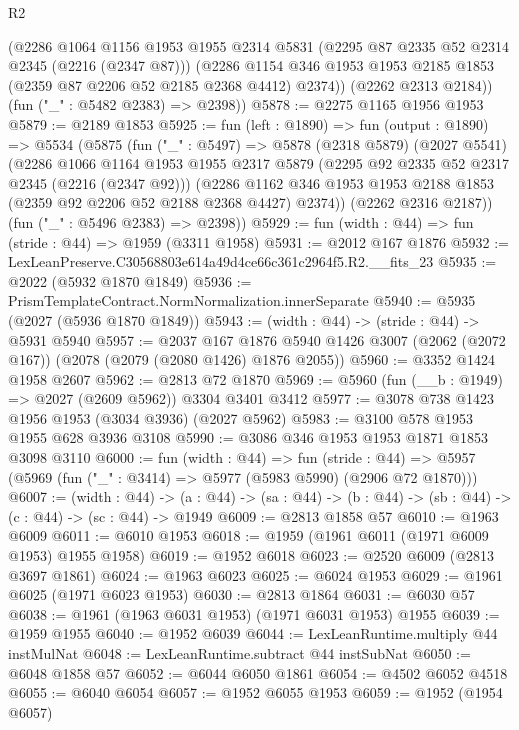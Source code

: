 \begin{lexlean}{R2}
\begin{coremodule}
        (@2286
          @1064
          @1156
          @1953
          @1955
          @2314
          @5831
          (@2295 @87 @2335 @52 @2314 @2345 (@2216 (@2347 @87)))
          (@2286 @1154 @346 @1953 @1953 @2185 @1853 (@2359 @87 @2206 @52 @2185 @2368 @4412) @2374))
        (@2262 @2313 @2184))
      (fun ("_" : @5482 @2383) => @2398))
@5878 := @2275 @1165 @1956 @1953
@5879 := @2189 @1853
@5925 := fun (left : @1890) =>
  fun (output : @1890) =>
  @5534
    (@5875
      (fun ("_" : @5497) =>
      @5878
        (@2318 @5879)
        (@2027 @5541)
        (@2286
          @1066
          @1164
          @1953
          @1955
          @2317
          @5879
          (@2295 @92 @2335 @52 @2317 @2345 (@2216 (@2347 @92)))
          (@2286 @1162 @346 @1953 @1953 @2188 @1853 (@2359 @92 @2206 @52 @2188 @2368 @4427) @2374))
        (@2262 @2316 @2187))
      (fun ("_" : @5496 @2383) => @2398))
@5929 := fun (width : @44) => fun (stride : @44) => @1959 (@3311 @1958)
@5931 := @2012 @167 @1876
@5932 := LexLeanPreserve.C30568803e614a49d4ce66c361c2964f5.R2.__fits_23
@5935 := @2022 (@5932 @1870 @1849)
@5936 := PrismTemplateContract.NormNormalization.innerSeparate
@5940 := @5935 (@2027 (@5936 @1870 @1849))
@5943 := (width : @44) -> (stride : @44) -> @5931 @5940
@5957 := @2037
    @167
    @1876
    @5940
    @1426
    @3007
    (@2062 (@2072 @167))
    (@2078 (@2079 (@2080 @1426) @1876 @2055))
@5960 := @3352 @1424 @1958 @2607
@5962 := @2813 @72 @1870
@5969 := @5960 (fun (__b : @1949) => @2027 (@2609 @5962)) @3304 @3401 @3412
@5977 := @3078 @738 @1423 @1956 @1953 (@3034 @3936) (@2027 @5962)
@5983 := @3100 @578 @1953 @1955 @628 @3936 @3108
@5990 := @3086 @346 @1953 @1953 @1871 @1853 @3098 @3110
@6000 := fun (width : @44) =>
  fun (stride : @44) => @5957 (@5969 (fun ("_" : @3414) => @5977 (@5983 @5990) (@2906 @72 @1870)))
@6007 := (width : @44) ->
  (a : @44) -> (sa : @44) -> (b : @44) -> (sb : @44) -> (c : @44) -> (sc : @44) -> @1949
@6009 := @2813 @1858 @57
@6010 := @1963 @6009
@6011 := @6010 @1953
@6018 := @1959 (@1961 @6011 (@1971 @6009 @1953) @1955 @1958)
@6019 := @1952 @6018
@6023 := @2520 @6009 (@2813 @3697 @1861)
@6024 := @1963 @6023
@6025 := @6024 @1953
@6029 := @1961 @6025 (@1971 @6023 @1953)
@6030 := @2813 @1864
@6031 := @6030 @57
@6038 := @1961 (@1963 @6031 @1953) (@1971 @6031 @1953) @1955
@6039 := @1959 @1955
@6040 := @1952 @6039
@6044 := LexLeanRuntime.multiply @44 instMulNat
@6048 := LexLeanRuntime.subtract @44 instSubNat
@6050 := @6048 @1858 @57
@6052 := @6044 @6050 @1861
@6054 := @4502 @6052 @4518
@6055 := @6040 @6054
@6057 := @1952 @6055 @1953
@6059 := @1952 (@1954 @6057)

\end{coremodule}
\end{lexlean}
